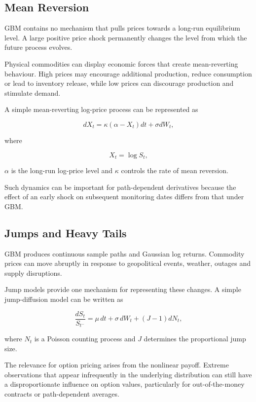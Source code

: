 \subsection{Mean Reversion}

GBM contains no mechanism that pulls prices towards a long-run equilibrium level. A large positive price shock permanently changes the level from which the future process evolves.

Physical commodities can display economic forces that create mean-reverting behaviour. High prices may encourage additional production, reduce consumption or lead to inventory release, while low prices can discourage production and stimulate demand.

A simple mean-reverting log-price process can be represented as

\begin{equation}
dX_t
=
\kappa(\alpha-X_t)dt
+
\sigma dW_t,
\end{equation}

where

\begin{equation}
X_t
=
\log S_t,
\end{equation}

$\alpha$ is the long-run log-price level and $\kappa$ controls the rate of mean reversion.

Such dynamics can be important for path-dependent derivatives because the effect of an early shock on subsequent monitoring dates differs from that under GBM.

\subsection{Jumps and Heavy Tails}

GBM produces continuous sample paths and Gaussian log returns. Commodity prices can move abruptly in response to geopolitical events, weather, outages and supply disruptions.

Jump models provide one mechanism for representing these changes. A simple jump-diffusion model can be written as

\begin{equation}
\frac{dS_t}{S_{t^-}}
=
\mu\,dt
+
\sigma\,dW_t
+
(J-1)dN_t,
\end{equation}

where $N_t$ is a Poisson counting process and $J$ determines the proportional jump size.

The relevance for option pricing arises from the nonlinear payoff. Extreme observations that appear infrequently in the underlying distribution can still have a disproportionate influence on option values, particularly for out-of-the-money contracts or path-dependent averages.

